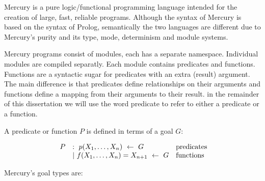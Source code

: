 

Mercury is a pure logic/functional programming language
intended for the creation of large, fast, reliable programs.
Although the syntax of Mercury is based on the syntax of Prolog,
semantically the two languages are different
due to Mercury's purity and its type, mode, determinism and module systems.

Mercury programs consist of modules,
each has a separate namespace.
Individual modules are compiled separatly.
Each module contains predicates and functions.
Functions are a syntactic sugar for predicates with an extra (result)
argument.
The main difference is that
predicates define relationships on their arguments and
functions define a mapping from their arguments to their result.
in the remainder of this dissertation we will use the word predicate to refer to
either a predicate or a function.

A predicate or function $P$ is defined in terms of a goal $G$:

$$
\begin{array}{lll}
~P
    & :~ p(X_1, \ldots, X_n)~\leftarrow~G
        & \hbox{predicates} \\
    & |~ f(X_1, \ldots, X_n)=X_{n+1}~\leftarrow~G
        & \hbox{functions} \\
\end{array}
$$


\noindent
Mercury's goal types are:


